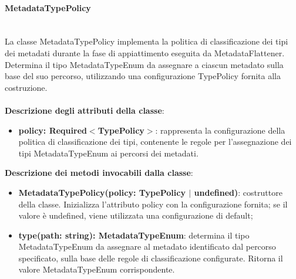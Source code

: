 \documentclass[a4paper,12pt]{article}
\begin{document}
{{{                \paragraph{MetadataTypePolicy}\label{par:MetadataTypePolicy}\mbox{}\\
                La classe MetadataTypePolicy implementa la politica di classificazione dei tipi dei metadati durante la fase di appiattimento eseguita da MetadataFlattener. Determina il tipo MetadataTypeEnum da assegnare a ciascun metadato sulla base del suo percorso, utilizzando una configurazione TypePolicy fornita alla costruzione.\\
                \\
                \textbf{Descrizione degli attributi della classe}:
                \begin{itemize}
                    \item \textbf{policy: Required$<$TypePolicy$>$}: rappresenta la configurazione della politica di classificazione dei tipi, contenente le regole per l'assegnazione dei tipi MetadataTypeEnum ai percorsi dei metadati.
                \end{itemize}
 
                \noindent \textbf{Descrizione dei metodi invocabili dalla classe}:
                \begin{itemize}
                    \item \textbf{MetadataTypePolicy(policy: TypePolicy $|$ undefined)}: costruttore della classe. Inizializza l'attributo policy con la configurazione fornita; se il valore è undefined, viene utilizzata una configurazione di default;
                    \item \textbf{type(path: string): MetadataTypeEnum}: determina il tipo MetadataTypeEnum da assegnare al metadato identificato dal percorso specificato, sulla base delle regole di classificazione configurate. Ritorna il valore MetadataTypeEnum corrispondente.
                \end{itemize}
}}}
\end{document}
